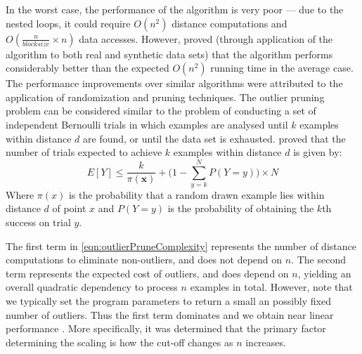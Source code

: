 In the worst case, the performance of the algorithm is very poor --- due to the
nested loops, it could require $O(n^2)$ distance computations and
$O(\frac{n}{blocksize} \times n)$ data accesses. However, \citeauthor{Bay:2003}
proved (through application of the algorithm to both real and synthetic data
sets) that the algorithm performs considerably better than the expected
$O(n^2)$ running time in the average case. The performance improvements over
similar algorithms were attributed to the application of randomization and
pruning techniques. The outlier pruning problem can be considered similar to the
problem of conducting a set of independent Bernoulli trials in which examples
are analysed until $k$ examples within distance $d$ are found, or until the data
set is exhausted. \citeauthor{Bay:2003} proved that the number of trials
expected to achieve $k$ examples within distance $d$ is given by:
\begin{equation}
    E[Y] \leq \frac{k}{\pi(\textbf{x})} + \Bigg(1-\sum_{y=k}^{N} P(Y=y)\Bigg) \times N
    \label{eqn:outlierPruneComplexity}
\end{equation}
Where $\pi(x)$ is the probability that a random drawn example lies within
distance $d$ of point $x$ and $P(Y=y)$ is the probability of obtaining the $k$th
success on trial $y$.

The first term in \autoref{eqn:outlierPruneComplexity} represents the number of
distance computations to eliminate non-outliers, and does not depend on $n$. The
second term represents the expected cost of outliers, and does depend on $n$,
yielding an overall quadratic dependency to process $n$ examples in total.
However, note that we typically set the program parameters to return a small an
possibly fixed number of outliers. Thus the first term dominates and we obtain
near linear performance \cite{Bay:2003}. More specifically, it was determined
that the primary factor determining the scaling is how the cut-off changes as
$n$ increases.
